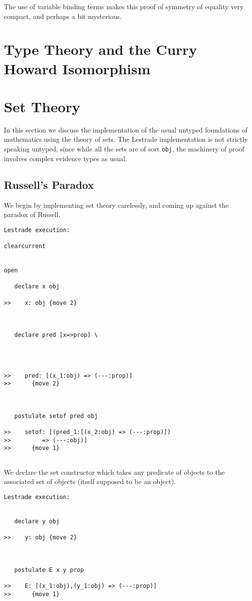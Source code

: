 \documentclass{article}
\begin{document}
The use of variable binding terms makes this proof of symmetry of equality very compact, and perhaps a bit mysterious.

\newpage

\section{Type Theory and the Curry Howard Isomorphism}

\newpage

\section{Set Theory}

In this section we discuss the implementation of the usual untyped foundations of mathematics using the theory of sets.  The Lestrade implementation is not strictly speaking untyped, since while all the sets are of sort {\tt obj}, the machinery of proof involves complex evidence types as usual.

\subsection{Russell's Paradox}

We begin by implementing set theory carelessly, and coming up against the paradox of Russell.

\begin{verbatim}Lestrade execution:

clearcurrent


open

   declare x obj

>>    x: obj {move 2}



   declare pred [x=>prop] \
      



>>    pred: [(x_1:obj) => (---:prop)]
>>      {move 2}



   postulate setof pred obj

>>    setof: [(pred_1:[(x_2:obj) => (---:prop)])
>>         => (---:obj)]
>>      {move 1}


\end{verbatim}

We declare the set constructor which takes any predicate of objects to the associated set of objects (itself supposed to be an object).

\begin{verbatim}Lestrade execution:


   declare y obj

>>    y: obj {move 2}



   postulate E x y prop

>>    E: [(x_1:obj),(y_1:obj) => (---:prop)]
>>      {move 1}


\end{verbatim}
\end{document}
